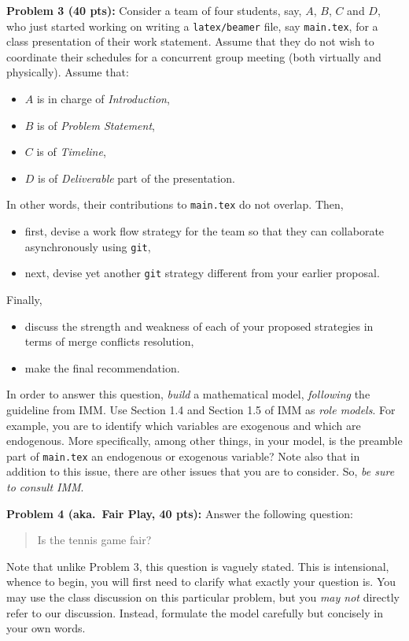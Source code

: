 \documentclass[12pt]{article}
\begin{document}
\newpage
\noindent\textbf{Problem 3 (40 pts):}
Consider a team of four students, say, $A$, $B$, $C$ and $D$, 
who just started working 
on writing a \texttt{latex/beamer} file, say \texttt{main.tex}, 
for a class presentation of their work statement.  
Assume that they do not wish to coordinate their schedules for a
concurrent group meeting (both virtually and physically).  
Assume that:
\begin{itemize}
\item $A$ is in charge of \emph{Introduction},
\item $B$ is of \emph{Problem Statement}, 
\item $C$ is of  \emph{Timeline},
\item $D$ is of \emph{Deliverable} part of the presentation.  
\end{itemize}
In other words, their contributions to \texttt{main.tex} do not overlap.
Then, 
\begin{itemize}
\item first, devise a work flow strategy for the team so that they can
  collaborate asynchronously using \texttt{git},
\item next, devise yet another \texttt{git} strategy different from your earlier
  proposal.  
\end{itemize}
Finally,
\begin{itemize}
\item discuss the strength and weakness of each of your proposed strategies in terms of merge
conflicts resolution,
\item make the final recommendation.  
\end{itemize}
In order to answer this question, \emph{build}
a mathematical model, \emph{following} the guideline from IMM. 
Use Section 1.4 and Section 1.5 of IMM as \emph{role models}.    
For example, you are to identify which variables  are exogenous 
and which are endogenous.  More specifically, among other things, 
in your model, is the preamble part of \texttt{main.tex} an endogenous 
or exogenous variable?  
Note also that in addition to this issue, there are other issues that
you are to consider.  So, \emph{be sure to consult IMM}. 

\vskip0.25in
\noindent\textbf{Problem 4 (aka.\ Fair Play, 40 pts):}
Answer the following question:
\begin{verse}
Is the tennis game fair?
\end{verse}
Note that unlike Problem 3, this question is vaguely stated.
This is intensional, whence to begin, you will first need to clarify
what exactly your question is.
You may use the class discussion on this particular 
problem, but you \emph{may not} directly refer to our 
discussion.  Instead, formulate the model carefully but concisely in 
your own words.   
\end{document}
